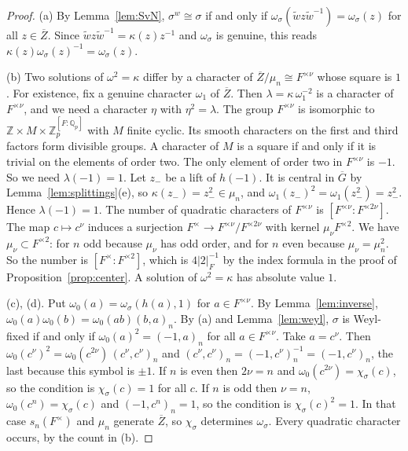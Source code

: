 \documentclass[12pt,letterpaper]{article}
\numberwithin{equation}{section}
\theoremstyle{definition}
\newcommand{\Z}{\mathbb Z}
\newcommand{\Q}{\mathbb Q}
\newcommand{\bG}{\overline{G}}
\newcommand{\bZ}{\overline{Z}}
\newcommand{\wt}{\tilde w}
\begin{document}
\begin{proof}
(a) By Lemma~\ref{lem:SvN}, $\sigma^w\cong\sigma$ if and only if
$\omega_\sigma(\wt z\wt^{-1})=\omega_\sigma(z)$ for all $z\in\bZ$.  Since
$\wt z\wt^{-1}=\kappa(z)z^{-1}$ and $\omega_\sigma$ is genuine, this reads
$\kappa(z)\omega_\sigma(z)^{-1}=\omega_\sigma(z)$.

(b) Two solutions of $\omega^2=\kappa$ differ by a character of $\bZ/\mu_n\cong F^{\times\nu}$
whose square is $1$.  For existence, fix a genuine character $\omega_1$ of $\bZ$.  Then
$\lambda=\kappa\,\omega_1^{-2}$ is a character of $F^{\times\nu}$, and we need a character
$\eta$ with $\eta^2=\lambda$.  The group $F^{\times\nu}$ is isomorphic to
$\Z\times M\times\Z_p^{[F:\Q_p]}$ with $M$ finite cyclic.  Its smooth characters on the
first and third factors form divisible groups.  A character of $M$ is a square if and only
if it is trivial on the elements of order two.  The only element of order two in
$F^{\times\nu}$ is $-1$.  So we need $\lambda(-1)=1$.  Let $z_{-}$ be a lift of $h(-1)$.
It is central in $\bG$ by Lemma~\ref{lem:splittings}(e), so $\kappa(z_-)=z_-^2\in\mu_n$, and
$\omega_1(z_-)^2=\omega_1(z_-^2)=z_-^2$.  Hence $\lambda(-1)=1$.  The number of quadratic
characters of $F^{\times\nu}$ is $[F^{\times\nu}:F^{\times2\nu}]$.  The map $c\mapsto c^\nu$
induces a surjection $F^\times\to F^{\times\nu}/F^{\times2\nu}$ with kernel
$\mu_\nu F^{\times2}$.  We have $\mu_\nu\subset F^{\times2}$: for $n$ odd because $\mu_\nu$ has
odd order, and for $n$ even because $\mu_\nu=\mu_n^2$.  So the number is
$[F^\times:F^{\times2}]$, which is $4|2|_F^{-1}$ by the index formula in the proof of
Proposition~\ref{prop:center}.  A solution of $\omega^2=\kappa$ has absolute value $1$.

(c), (d).  Put $\omega_0(a)=\omega_\sigma(h(a),1)$ for $a\in F^{\times\nu}$.  By
Lemma~\ref{lem:inverse}, $\omega_0(a)\omega_0(b)=\omega_0(ab)(b,a)_n$.  By (a) and
Lemma~\ref{lem:weyl}, $\sigma$ is Weyl-fixed if and only if $\omega_0(a)^2=(-1,a)_n$ for
all $a\in F^{\times\nu}$.  Take $a=c^\nu$.  Then
$\omega_0(c^\nu)^2=\omega_0(c^{2\nu})\,(c^\nu,c^\nu)_n$ and
$(c^\nu,c^\nu)_n=(-1,c^\nu)_n^{-1}=(-1,c^\nu)_n$, the last because this symbol is $\pm1$.
If $n$ is even then $2\nu=n$ and $\omega_0(c^{2\nu})=\chi_\sigma(c)$, so the condition is
$\chi_\sigma(c)=1$ for all $c$.  If $n$ is odd then $\nu=n$, $\omega_0(c^n)=\chi_\sigma(c)$
and $(-1,c^n)_n=1$, so the condition is $\chi_\sigma(c)^2=1$.  In that case $s_n(F^\times)$
and $\mu_n$ generate $\bZ$, so $\chi_\sigma$ determines $\omega_\sigma$.  Every quadratic
character occurs, by the count in (b).
\end{proof}
\end{document}
